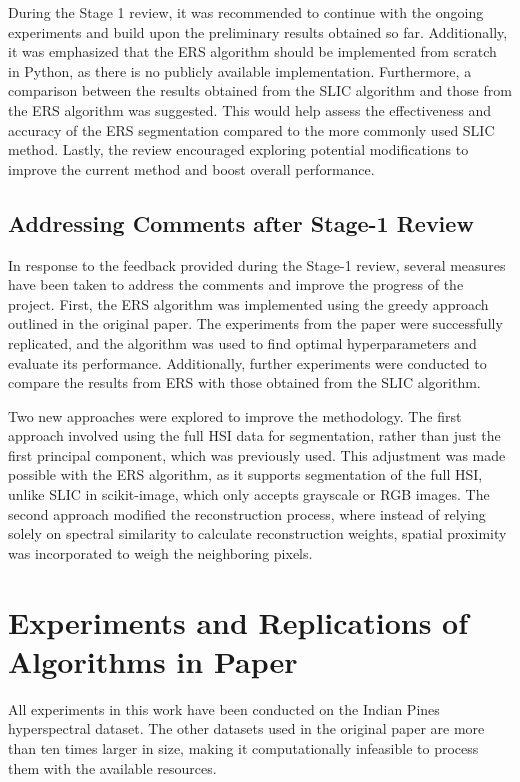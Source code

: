 \documentclass[twoside,english]{article}
\begin{document}
During the Stage 1 review, it was recommended to continue with the ongoing experiments and build upon the preliminary results obtained so far. Additionally, it was emphasized that the ERS algorithm should be implemented from scratch in Python, as there is no publicly available implementation. Furthermore, a comparison between the results obtained from the SLIC algorithm and those from the ERS algorithm was suggested. This would help assess the effectiveness and accuracy of the ERS segmentation compared to the more commonly used SLIC method. Lastly, the review encouraged exploring potential modifications to improve the current method and boost overall performance.

\subsection{Addressing Comments after Stage-1 Review}
In response to the feedback provided during the Stage-1 review, several measures have been taken to address the comments and improve the progress of the project. First, the ERS algorithm was implemented using the greedy approach outlined in the original paper. The experiments from the paper were successfully replicated, and the algorithm was used to find optimal hyperparameters and evaluate its performance. Additionally, further experiments were conducted to compare the results from ERS with those obtained from the SLIC algorithm.

Two new approaches were explored to improve the methodology. The first approach involved using the full HSI data for segmentation, rather than just the first principal component, which was previously used. This adjustment was made possible with the ERS algorithm, as it supports segmentation of the full HSI, unlike SLIC in scikit-image, which only accepts grayscale or RGB images. The second approach modified the reconstruction process, where instead of relying solely on spectral similarity to calculate reconstruction weights, spatial proximity was incorporated to weigh the neighboring pixels.

\section{Experiments and Replications of Algorithms in Paper} 
All experiments in this work have been conducted on the Indian Pines hyperspectral dataset. The other datasets used in the original paper are more than ten times larger in size, making it computationally infeasible to process them with the available resources.
\end{document}
